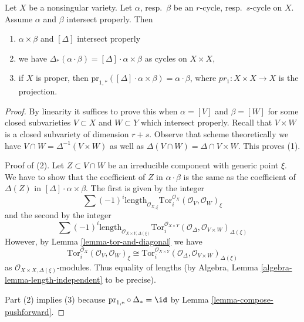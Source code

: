 \begin{lemma}
\label{lemma-reduction-diagonal}
Let $X$ be a nonsingular variety. Let $\alpha$, resp.\ $\beta$
be an $r$-cycle, resp.\ $s$-cycle on $X$. Assume $\alpha$ and $\beta$
intersect properly. Then
\begin{enumerate}
\item $\alpha \times \beta$ and $[\Delta]$ intersect properly
\item we have $\Delta_*(\alpha \cdot \beta) = [\Delta] \cdot \alpha\times\beta$
as cycles on $X \times X$,
\item if $X$ is proper, then
$\text{pr}_{1, *}([\Delta] \cdot \alpha\times\beta) = \alpha\cdot\beta$,
where $pr_1 : X\times X \to X$ is the projection.
\end{enumerate}
\end{lemma}

\begin{proof}
By linearity it suffices to prove this when $\alpha = [V]$ and $\beta = [W]$
for some closed subvarieties $V \subset X$ and $W \subset Y$ which intersect
properly. Recall that $V \times W$ is a closed subvariety of dimension $r + s$.
Observe that scheme theoretically we have
$V \cap W = \Delta^{-1}(V \times W)$ as well as
$\Delta(V \cap W) = \Delta \cap V \times W$.
This proves (1).

\medskip\noindent
Proof of (2). Let $Z \subset V \cap W$ be an irreducible component
with generic point $\xi$. We have to show that the coefficient of
$Z$ in $\alpha \cdot \beta$ is the same as the coefficient of
$\Delta(Z)$ in $[\Delta] \cdot \alpha \times \beta$. The first is given
by the integer
$$
\sum (-1)^i
\text{length}_{\mathcal{O}_{X, \xi}}
\text{Tor}_i^{\mathcal{O}_X}(\mathcal{O}_V, \mathcal{O}_W)_\xi
$$
and the second by the integer
$$
\sum (-1)^i
\text{length}_{\mathcal{O}_{X \times Y, \Delta(\xi)}}
\text{Tor}_i^{\mathcal{O}_{X \times Y}}(
\mathcal{O}_\Delta, \mathcal{O}_{V \times W})_{\Delta(\xi)}
$$
However, by Lemma \ref{lemma-tor-and-diagonal} we have
$$
\text{Tor}_i^{\mathcal{O}_X}(\mathcal{O}_V, \mathcal{O}_W)_\xi \cong
\text{Tor}_i^{\mathcal{O}_{X \times Y}}(
\mathcal{O}_\Delta, \mathcal{O}_{V \times W})_{\Delta(\xi)}
$$
as $\mathcal{O}_{X \times X, \Delta(\xi)}$-modules. Thus equality
of lengths (by Algebra, Lemma \ref{algebra-lemma-length-independent}
to be precise).

\medskip\noindent
Part (2) implies (3) because
$\text{pr}_{1, *} \circ \Delta_* = \id$ by
Lemma \ref{lemma-compose-pushforward}.
\end{proof}

